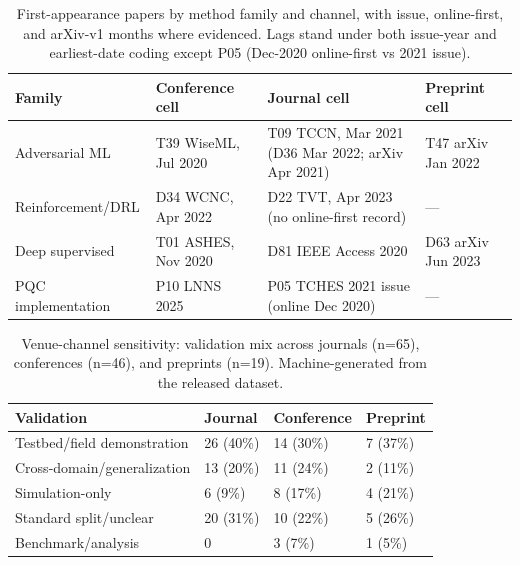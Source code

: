 \begin{table}[tbp]
\centering
\footnotesize
\caption{First-appearance papers by method family and channel, with issue, online-first, and arXiv-v1 months where evidenced. Lags stand under both issue-year and earliest-date coding except P05 (Dec-2020 online-first vs 2021 issue).}
\label{tab:firstappear}
\begin{tabular}{@{}l l p{4.6cm} l@{}}
\toprule
Family & Conference cell & Journal cell & Preprint cell \\
\midrule
Adversarial ML & T39 WiseML, Jul 2020 & T09 TCCN, Mar 2021 (D36 Mar 2022; arXiv Apr 2021) & T47 arXiv Jan 2022 \\
Reinforcement/DRL & D34 WCNC, Apr 2022 & D22 TVT, Apr 2023 (no online-first record) & --- \\
Deep supervised & T01 ASHES, Nov 2020 & D81 IEEE Access 2020 & D63 arXiv Jun 2023 \\
PQC implementation & P10 LNNS 2025 & P05 TCHES 2021 issue (online Dec 2020) & --- \\
\bottomrule
\end{tabular}
\end{table}

\begin{table}[tbp]
\centering
\caption{Venue-channel sensitivity: validation mix across journals (n=65), conferences (n=46), and preprints (n=19). Machine-generated from the released dataset.}
\label{tab:sensitivity}
\begin{tabular}{llll}
\toprule
Validation & Journal & Conference & Preprint \\
\midrule
Testbed/field demonstration & 26 (40\%) & 14 (30\%) & 7 (37\%) \\
Cross-domain/generalization & 13 (20\%) & 11 (24\%) & 2 (11\%) \\
Simulation-only & 6 (9\%) & 8 (17\%) & 4 (21\%) \\
Standard split/unclear & 20 (31\%) & 10 (22\%) & 5 (26\%) \\
Benchmark/analysis & 0 & 3 (7\%) & 1 (5\%) \\
\bottomrule
\end{tabular}
\end{table}


